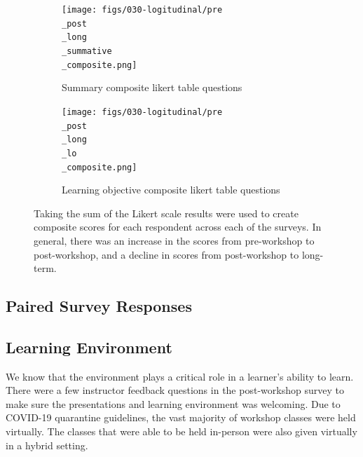 \documentclass[030-workshop.tex]{subfiles}
\begin{document}
            \begin{figure}[htb]
                \centering
                \begin{subfigure}[h]{0.45\textwidth}
                    \centering
                    \texttt{[image: figs/030-logitudinal/pre\\\_post\\\_long\\\_summative\\\_composite.png]}
                    \caption[Pre-Post-workshop and Long-term Survey for summary likert composite]
                    {Summary composite likert table questions}
                    \label{sfig:pre-post-long-composite-summary}
                \end{subfigure}
                \hfill
                \begin{subfigure}[h]{0.45\textwidth}
                    \centering
                    \texttt{[image: figs/030-logitudinal/pre\\\_post\\\_long\\\_lo\\\_composite.png]}
                    \caption[Pre-Post-workshop and Long-term Survey for learning objective likert composite]
                    {Learning objective composite likert table questions}
                    \label{sfig:pre-post-long-composite-lo}
                \end{subfigure}
                \caption[Summary table and learning objective composite likert questions (pre, post, long-term)]
                {Taking the sum of the Likert scale results were used to create composite scores for each respondent
                 across each of the surveys.
                 In general, there was an increase in the scores from pre-workshop to post-workshop,
                 and a decline in scores from post-workshop to long-term.
                }
                \label{fig:pre-post-long-composite-summary-lo}
            \end{figure}

    \subsection{Paired Survey Responses}

    \subsection{Learning Environment}

        We know that the environment plays a critical role in a learner's ability to learn.
        There were a few instructor feedback questions in the post-workshop survey to make sure
        the presentations and learning environment was welcoming.
        Due to COVID-19 quarantine guidelines,
        the vast majority of workshop classes were held virtually.
        The classes that were able to be held in-person were also given virtually in a hybrid setting.
\end{document}
